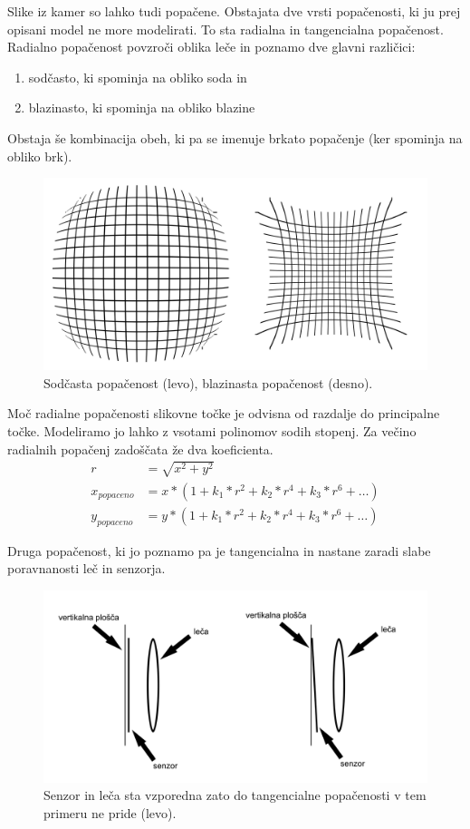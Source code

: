 \documentclass[a4paper, 12pt]{book}
\begin{document}
Slike iz kamer so lahko tudi popačene. Obstajata dve vrsti popačenosti, ki ju prej opisani model ne more modelirati. To sta radialna in tangencialna popačenost. Radialno popačenost povzroči oblika leče in poznamo dve glavni različici:
\begin{enumerate}
\itemsep0em
\item sodčasto, ki spominja na obliko soda in
\item blazinasto, ki spominja na obliko blazine
\end{enumerate}
Obstaja še kombinacija obeh, ki pa se imenuje brkato popačenje (ker spominja na obliko brk).

\begin{figure}[H]
\centering
\includegraphics[width=\textwidth,height=\textheight,keepaspectratio]{distorsion.png}
\caption{Sodčasta popačenost (levo), blazinasta popačenost (desno).}
\end{figure}

Moč radialne popačenosti slikovne točke je odvisna od razdalje do principalne točke. Modeliramo jo lahko z vsotami polinomov sodih stopenj. Za večino radialnih popačenj zadoščata že dva koeficienta. 
\begin{align}
\label{radialdisteq}
r &= \sqrt{x^2 + y^2} \\ 
x_{popaceno} &= x * (1 + k_1*r^2 + k_2*r^4 + k_3*r^6 + \dots) \\
y_{popaceno} &= y * (1 + k_1*r^2 + k_2*r^4 + k_3*r^6 + \dots)
\end{align}

Druga popačenost, ki jo poznamo pa je tangencialna in nastane zaradi slabe poravnanosti leč in senzorja.

\begin{figure}[H]
\centering
\includegraphics[width=\textwidth,height=\textheight,keepaspectratio]{tangential.png}
\caption{Senzor in leča sta vzporedna zato do tangencialne popačenosti v tem primeru ne pride (levo).}
\end{figure}
\end{document}

